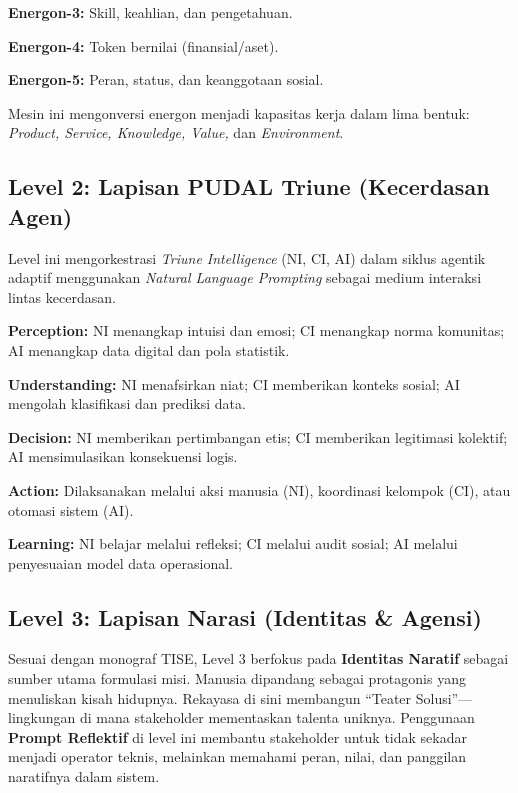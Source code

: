 \documentclass[
  letterpaper,
  DIV=11,
  numbers=noendperiod]{scrreprt}
\begin{document}
\textbf{Energon-3:} Skill, keahlian, dan pengetahuan.

\textbf{Energon-4:} Token bernilai (finansial/aset).

\textbf{Energon-5:} Peran, status, dan keanggotaan sosial.

Mesin ini mengonversi energon menjadi kapasitas kerja dalam lima bentuk:
\emph{Product, Service, Knowledge, Value,} dan \emph{Environment}.

\subsection{Level 2: Lapisan PUDAL Triune (Kecerdasan
Agen)}\label{level-2-lapisan-pudal-triune-kecerdasan-agen}

Level ini mengorkestrasi \emph{Triune Intelligence} (NI, CI, AI) dalam
siklus agentik adaptif menggunakan \emph{Natural Language Prompting}
sebagai medium interaksi lintas kecerdasan.

\textbf{Perception:} NI menangkap intuisi dan emosi; CI menangkap norma
komunitas; AI menangkap data digital dan pola statistik.

\textbf{Understanding:} NI menafsirkan niat; CI memberikan konteks
sosial; AI mengolah klasifikasi dan prediksi data.

\textbf{Decision:} NI memberikan pertimbangan etis; CI memberikan
legitimasi kolektif; AI mensimulasikan konsekuensi logis.

\textbf{Action:} Dilaksanakan melalui aksi manusia (NI), koordinasi
kelompok (CI), atau otomasi sistem (AI).

\textbf{Learning:} NI belajar melalui refleksi; CI melalui audit sosial;
AI melalui penyesuaian model data operasional.

\subsection{Level 3: Lapisan Narasi (Identitas \&
Agensi)}\label{level-3-lapisan-narasi-identitas-agensi}

Sesuai dengan monograf TISE, Level 3 berfokus pada \textbf{Identitas
Naratif} sebagai sumber utama formulasi misi. Manusia dipandang sebagai
protagonis yang menuliskan kisah hidupnya. Rekayasa di sini membangun
``Teater Solusi''---lingkungan di mana stakeholder mementaskan talenta
uniknya. Penggunaan \textbf{Prompt Reflektif} di level ini membantu
stakeholder untuk tidak sekadar menjadi operator teknis, melainkan
memahami peran, nilai, dan panggilan naratifnya dalam sistem.
\end{document}
